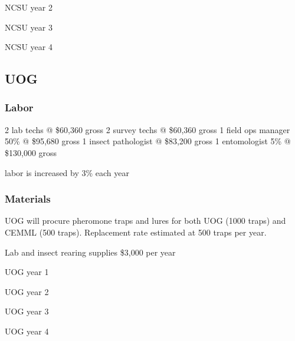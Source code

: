 \documentclass[11pt,english,letterpaper]{scrartcl}
\begin{document}
\begin{table}[h]
	\centering
	\caption{NCSU year 2}	
	
\end{table}

\begin{table}[h]
	\centering
	\caption{NCSU year 3}	
	
\end{table}

\begin{table}[h]
	\centering
	\caption{NCSU year 4}	
	
\end{table}

\clearpage

\subsection{UOG}

\subsubsection{Labor}

2 lab techs @ \$60,360 gross
2 survey techs @ \$60,360 gross
1 field ops manager 50\% @ \$95,680 gross
1 insect pathologist @ \$83,200 gross
1 entomologist 5\% @ \$130,000 gross

labor is increased by 3\% each year

\subsubsection{Materials}

UOG will procure pheromone traps and lures for both UOG (1000 traps) and CEMML (500 traps). Replacement rate estimated at 500 traps per year.

Lab and insect rearing supplies \$3,000 per year

\begin{table}[h]
	\centering
	\caption{UOG year 1}	
	
\end{table}

\begin{table}[h]
	\centering
	\caption{UOG year 2}	
	
\end{table}

\begin{table}[h]
	\centering
	\caption{UOG year 3}	
	
\end{table}

\begin{table}[h]
	\centering
	\caption{UOG year 4}	
	
\end{table}
\end{document}
